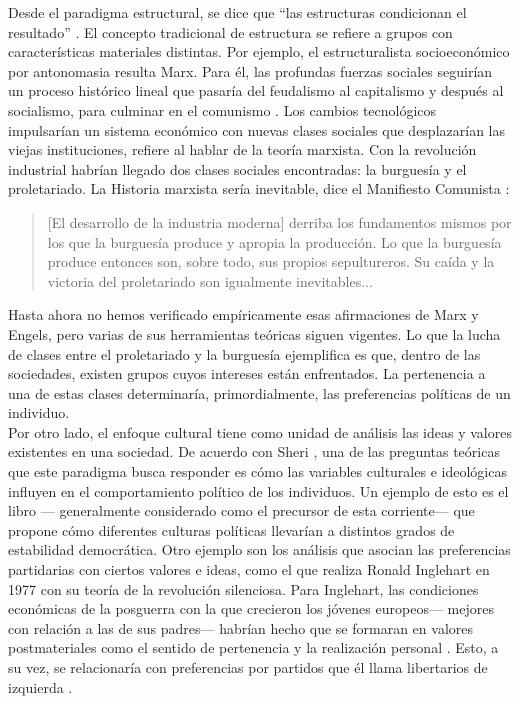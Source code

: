 Desde el paradigma estructural, se dice que ``las estructuras condicionan el resultado'' \parencite{BV08}. El concepto tradicional de estructura se refiere a grupos con características materiales distintas. Por ejemplo, el estructuralista socioeconómico por antonomasia resulta Marx. Para él, las profundas fuerzas sociales seguirían un proceso histórico lineal que pasaría del feudalismo al capitalismo y después al socialismo, para culminar en el comunismo \parencite{BV08}. Los cambios tecnológicos impulsarían un sistema económico con nuevas clases sociales que desplazarían las viejas instituciones, refiere \textcite{Heilbroner92} al hablar de la teoría marxista. Con la revolución industrial habrían llegado dos clases sociales encontradas: la burguesía y el proletariado. La Historia marxista sería inevitable, dice el Manifiesto Comunista \parencite{Heilbroner92}: 
\begin{quote}
[El desarrollo de la industria moderna] derriba los fundamentos mismos por los que la burguesía produce y apropia la producción. Lo que la burguesía produce entonces son, sobre todo, sus propios sepultureros. Su caída y la victoria del proletariado son igualmente inevitables...
\end{quote}

Hasta ahora no hemos verificado empíricamente esas afirmaciones de Marx y Engels, pero varias de sus herramientas teóricas siguen vigentes. Lo que la lucha de clases entre el proletariado y la burguesía ejemplifica es que, dentro de las sociedades, existen grupos cuyos intereses están enfrentados. La pertenencia a una de estas clases determinaría, primordialmente, las preferencias políticas de un individuo.\\

Por otro lado, el enfoque cultural tiene como unidad de análisis las ideas y valores existentes en una sociedad. 
De acuerdo con Sheri \textcite{Berman01}, una de las preguntas teóricas que este paradigma busca responder es cómo las variables culturales e ideológicas influyen en el comportamiento político de los individuos. Un ejemplo de esto es el libro  \parencite{AlmondVerba63}--- generalmente considerado como el precursor de esta corriente--- que propone cómo diferentes culturas políticas llevarían a distintos grados de estabilidad democrática. Otro ejemplo son los análisis que asocian las preferencias partidarias con ciertos valores e ideas, como el que realiza Ronald Inglehart en 1977 con su teoría de la revolución silenciosa. Para Inglehart, las condiciones económicas de la posguerra con la que crecieron los jóvenes europeos--- mejores con relación a las de sus padres--- habrían hecho que se formaran en valores postmateriales como el sentido de pertenencia y la realización personal \parencite{Kesselman79}. Esto, a su vez, se relacionaría con preferencias por partidos que él llama libertarios de izquierda \parencite{Inglehart16}.\\ 

